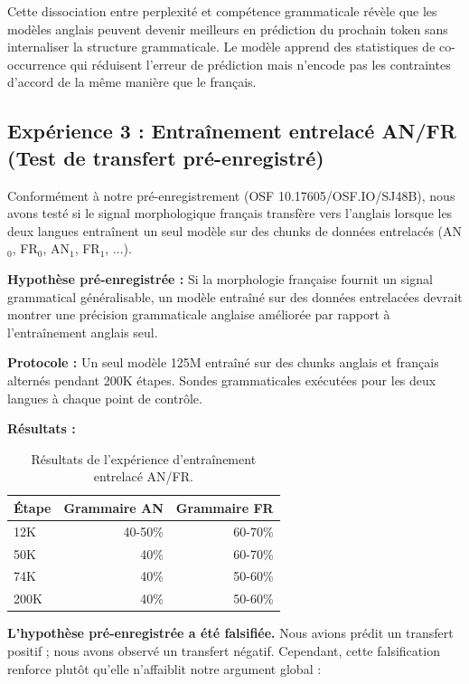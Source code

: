\documentclass[11pt,a4paper]{article}
\begin{document}
Cette dissociation entre perplexité et compétence grammaticale révèle que les modèles anglais peuvent devenir meilleurs en prédiction du prochain token sans internaliser la structure grammaticale. Le modèle apprend des statistiques de co-occurrence qui réduisent l'erreur de prédiction mais n'encode pas les contraintes d'accord de la même manière que le français.

\subsection{Expérience 3 : Entraînement entrelacé AN/FR (Test de transfert pré-enregistré)}

Conformément à notre pré-enregistrement (OSF 10.17605/OSF.IO/SJ48B), nous avons testé si le signal morphologique français transfère vers l'anglais lorsque les deux langues entraînent un seul modèle sur des chunks de données entrelacés (AN$_0$, FR$_0$, AN$_1$, FR$_1$, ...).

\textbf{Hypothèse pré-enregistrée :} Si la morphologie française fournit un signal grammatical généralisable, un modèle entraîné sur des données entrelacées devrait montrer une précision grammaticale anglaise améliorée par rapport à l'entraînement anglais seul.

\textbf{Protocole :} Un seul modèle 125M entraîné sur des chunks anglais et français alternés pendant 200K étapes. Sondes grammaticales exécutées pour les deux langues à chaque point de contrôle.

\textbf{Résultats :}

\begin{table}[H]
\centering
\begin{tabular}{lrr}
\toprule
\textbf{Étape} & \textbf{Grammaire AN} & \textbf{Grammaire FR} \\
\midrule
12K & 40-50\% & 60-70\% \\
50K & 40\% & 60-70\% \\
74K & 40\% & 50-60\% \\
200K & 40\% & 50-60\% \\
\bottomrule
\end{tabular}
\caption{Résultats de l'expérience d'entraînement entrelacé AN/FR.}
\label{tab:interleaved}
\end{table}

\textbf{L'hypothèse pré-enregistrée a été falsifiée.} Nous avions prédit un transfert positif ; nous avons observé un transfert négatif. Cependant, cette falsification renforce plutôt qu'elle n'affaiblit notre argument global :
\end{document}
